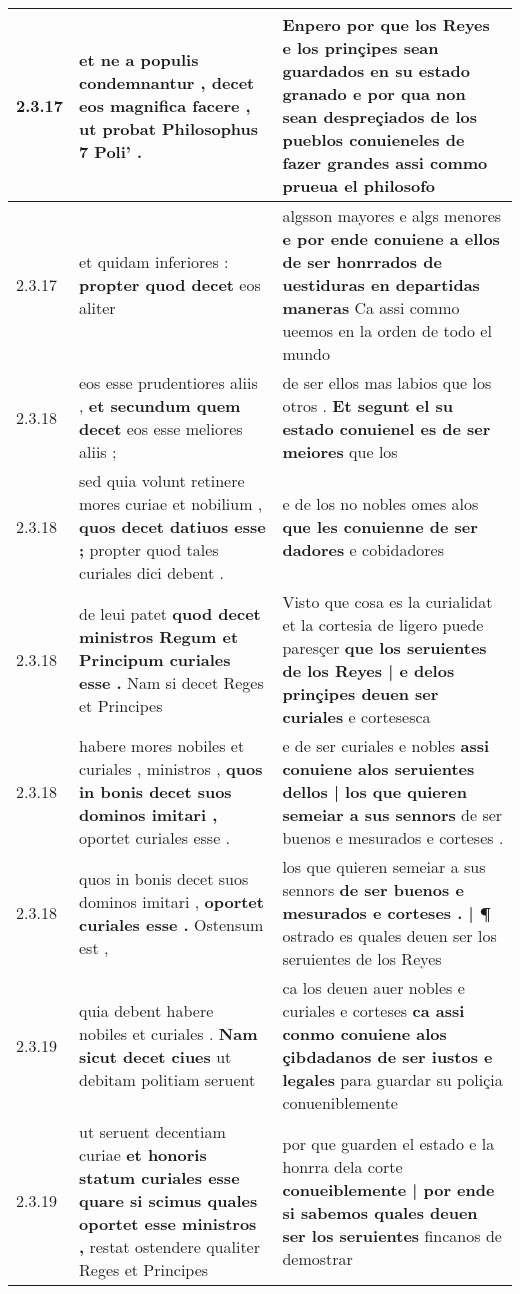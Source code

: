 \begin{tabular}{|p{1cm}|p{6.5cm}|p{6.5cm}|}
2.3.17 & et ne a populis condemnantur , \textbf{ decet eos magnifica facere , } ut probat Philosophus 7 Poli’ . & Enpero por que los Reyes e los prinçipes sean guardados en su estado granado \textbf{ e por qua non sean despreçiados de los pueblos conuieneles de fazer grandes } assi commo prueua el philosofo \\\hline
2.3.17 & et quidam inferiores : \textbf{ propter quod decet } eos aliter & algsson mayores e algs menores \textbf{ e por ende conuiene a ellos de ser honrrados de uestiduras en departidas maneras } Ca assi commo ueemos en la orden de todo el mundo \\\hline
2.3.18 & eos esse prudentiores aliis , \textbf{ et secundum quem decet } eos esse meliores aliis ; & de ser ellos mas labios que los otros . \textbf{ Et segunt el su estado conuienel es de ser meiores } que los \\\hline
2.3.18 & sed quia volunt retinere mores curiae et nobilium , \textbf{ quos decet datiuos esse ; } propter quod tales curiales dici debent . & e de los no nobles omes alos \textbf{ que les conuienne de ser dadores } e cobidadores \\\hline
2.3.18 & de leui patet \textbf{ quod decet ministros Regum et Principum curiales esse . } Nam si decet Reges et Principes & Visto que cosa es la curialidat et la cortesia de ligero puede paresçer \textbf{ que los seruientes de los Reyes | e delos prinçipes deuen ser curiales } e cortesesca \\\hline
2.3.18 & habere mores nobiles et curiales , ministros , \textbf{ quos in bonis decet suos dominos imitari , } oportet curiales esse . & e de ser curiales e nobles \textbf{ assi conuiene alos seruientes dellos | los que quieren semeiar a sus sennors } de ser buenos e mesurados e corteses . \\\hline
2.3.18 & quos in bonis decet suos dominos imitari , \textbf{ oportet curiales esse . } Ostensum est , & los que quieren semeiar a sus sennors \textbf{ de ser buenos e mesurados e corteses . | ¶ } ostrado es quales deuen ser los seruientes de los Reyes \\\hline
2.3.19 & quia debent habere nobiles et curiales . \textbf{ Nam sicut decet ciues } ut debitam politiam seruent & ca los deuen auer nobles e curiales e corteses \textbf{ ca assi conmo conuiene alos çibdadanos de ser iustos e legales } para guardar su poliçia conueniblemente \\\hline
2.3.19 & ut seruent decentiam curiae \textbf{ et honoris statum curiales esse quare si scimus quales oportet esse ministros , } restat ostendere qualiter Reges et Principes & por que guarden el estado e la honrra dela corte \textbf{ conueiblemente | por ende si sabemos quales deuen ser los seruientes } fincanos de demostrar \\\hline

\end{tabular}
